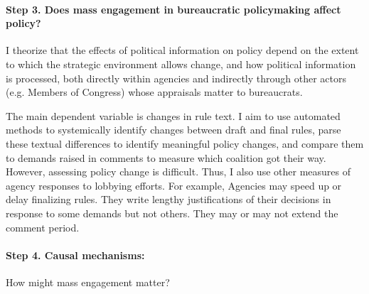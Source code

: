 





\paragraph{Step 3. Does mass engagement in bureaucratic policymaking affect policy?} I theorize that the effects of political information on policy depend on the extent to which the strategic environment allows change, and how political information is processed, both directly within agencies and indirectly through other actors (e.g. Members of Congress) whose appraisals matter to bureaucrats.

The main dependent variable is changes in rule text.
I aim to use automated methods to systemically identify changes between draft and final rules, parse these textual differences to identify meaningful policy changes, and compare them to demands raised in comments to measure which coalition got their way. However, assessing policy change is difficult. Thus, I also use other measures of agency responses to lobbying efforts. For example,
Agencies may speed up or delay finalizing rules. They write lengthy justifications of their decisions in response to some demands but not others. They may or may not extend the comment period.


\paragraph{Step 4. Causal mechanisms:} How might mass engagement matter?

